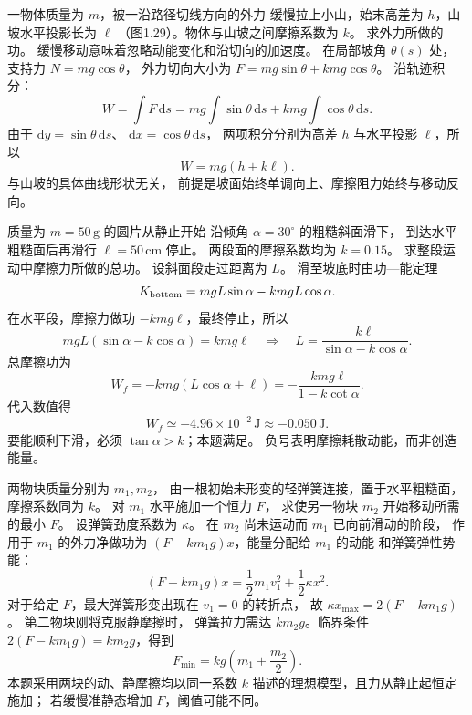 一物体质量为 $m$，被一沿路径切线方向的外力
缓慢拉上小山，始末高差为 $h$，山坡水平投影长为 $\ell$
（图1.29）。物体与山坡之间摩擦系数为 $k$。
求外力所做的功。
\exsolution
缓慢移动意味着忽略动能变化和沿切向的加速度。
在局部坡角 $\theta(s)$ 处，
支持力 $N=mg\cos\theta$，
外力切向大小为
$F=mg\sin\theta+kmg\cos\theta$。
沿轨迹积分：
\[
W=\int F\,\mathrm ds
=mg\int\sin\theta\,\mathrm ds
+kmg\int\cos\theta\,\mathrm ds.
\]
由于 $\mathrm dy=\sin\theta\,\mathrm ds$、
$\mathrm dx=\cos\theta\,\mathrm ds$，
两项积分分别为高差 $h$ 与水平投影 $\ell$，所以
\[
\boxed{W=mg(h+k\ell)}.
\]
\excheck 与山坡的具体曲线形状无关，
前提是坡面始终单调向上、摩擦阻力始终与移动反向。

质量为 $m=50\,\mathrm g$ 的圆片从静止开始
沿倾角 $\alpha=30^\circ$ 的粗糙斜面滑下，
到达水平粗糙面后再滑行 $\ell=50\,\mathrm{cm}$ 停止。
两段面的摩擦系数均为 $k=0.15$。
求整段运动中摩擦力所做的总功。
\exsolution
设斜面段走过距离为 $L$。
滑至坡底时由功—能定理
\[
K_{\rm bottom}=mgL\sin\alpha-kmgL\cos\alpha.
\]
在水平段，摩擦力做功 $-kmg\ell$，最终停止，所以
\[
mgL(\sin\alpha-k\cos\alpha)=kmg\ell
\quad\Longrightarrow\quad
L=\frac{k\ell}{\sin\alpha-k\cos\alpha}.
\]
总摩擦功为
\[
W_f=-kmg(L\cos\alpha+\ell)
=-\frac{kmg\ell}{1-k\cot\alpha}.
\]
代入数值得
\[
\boxed{W_f\simeq-4.96\times10^{-2}\,\mathrm J
\approx-0.050\,\mathrm J}.
\]
\excheck 要能顺利下滑，必须
$\tan\alpha>k$；本题满足。
负号表明摩擦耗散动能，而非创造能量。

两物块质量分别为 $m_1,m_2$，
由一根初始未形变的轻弹簧连接，置于水平粗糙面，
摩擦系数同为 $k$。
对 $m_1$ 水平施加一个恒力 $F$，
求使另一物块 $m_2$ 开始移动所需的最小 $F$。
\exsolution
设弹簧劲度系数为 $\kappa$。
在 $m_2$ 尚未运动而 $m_1$ 已向前滑动的阶段，
作用于 $m_1$ 的外力净做功为
$(F-km_1g)x$，能量分配给 $m_1$ 的动能
和弹簧弹性势能：
\[
(F-km_1g)x=\frac12m_1v_1^2+\frac12\kappa x^2.
\]
对于给定 $F$，最大弹簧形变出现在 $v_1=0$ 的转折点，
故 $\kappa x_{\max}=2(F-km_1g)$。
第二物块刚将克服静摩擦时，
弹簧拉力需达 $km_2g$。临界条件
$2(F-km_1g)=km_2g$，得到
\[
\boxed{F_{\min}=kg\left(m_1+\frac{m_2}{2}\right)}.
\]
\excheck 本题采用两块的动、静摩擦均以同一系数 $k$
描述的理想模型，且力从静止起恒定施加；
若缓慢准静态增加 $F$，阈值可能不同。

